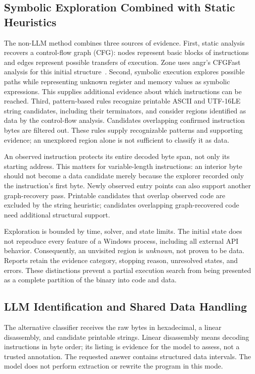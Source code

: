 \subsection{Symbolic Exploration Combined with Static Heuristics}
The non-LLM method combines three sources of evidence. First, static
analysis recovers a control-flow graph (CFG): nodes represent basic blocks
of instructions and edges represent possible transfers of execution.
Zone uses angr's CFGFast analysis for this initial structure~\cite{angr_cfg_docs}.
Second, symbolic execution explores possible paths while representing
unknown register and memory values as symbolic expressions. This supplies
additional evidence about which instructions can be reached. Third,
pattern-based rules recognize printable ASCII and UTF-16LE string
candidates, including their terminators, and consider regions identified
as data by the control-flow analysis. Candidates overlapping confirmed
instruction bytes are filtered out. These rules supply recognizable
patterns and supporting evidence; an unexplored region alone is not
sufficient to classify it as data.

An observed instruction protects its entire decoded byte span, not only
its starting address. This matters for variable-length instructions: an
interior byte should not become a data candidate merely because the
explorer recorded only the instruction's first byte. Newly observed entry
points can also support another graph-recovery pass. Printable candidates
that overlap observed code are excluded by the string heuristic; candidates
overlapping graph-recovered code need additional structural support.

Exploration is bounded by time, solver, and state limits. The initial state
does not reproduce every feature of a Windows process, including all
external API behavior. Consequently, an unvisited region is \emph{unknown},
not proven to be data. Reports retain the evidence category, stopping
reason, unresolved states, and errors. These distinctions prevent a
partial execution search from being presented as a complete partition of
the binary into code and data.

\subsection{LLM Identification and Shared Data Handling}
The alternative classifier receives the raw bytes in hexadecimal, a
linear disassembly, and candidate printable strings. Linear disassembly
means decoding instructions in byte order; its listing is evidence for the
model to assess, not a trusted annotation. The requested answer contains
structured data intervals. The model does not perform extraction or
rewrite the program in this mode.

